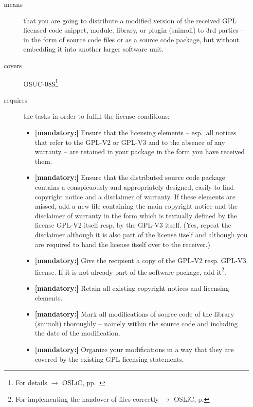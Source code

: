 \begin{description}
\item[means] that you are going to distribute a modified version of the received
GPL licensed code snippet, module, library, or plugin (snimoli) to 3rd parties
-- in the form of source code files or as a source code package, but without
embedding it into another larger software unit.
\item[covers] OSUC-08S\footnote{For details $\rightarrow$ OSLiC, pp.\
\pageref{OSUC-08S-DEF}}
\item[requires] the tasks in order to fulfill the license conditions:
\begin{itemize}
 
  \item \textbf{[mandatory:]} Ensure that the licensing elements -- esp.\ all
  notices that refer to the GPL-V2 or GPL-V3 and to the absence of any
  warranty -- are retained in your package in the form you have received them.

  \item \textbf{[mandatory:]} Ensure that the distributed source code package
  contains a conspicuously and appropriately designed, easily to find copyright
  notice and a disclaimer of warranty. If these elements are missed, add a new
  file containing the main copyright notice and the disclaimer of warranty in the
  form which is textually defined by the license GPL-V2 itself resp. by the
  GPL-V3 itself. (Yes, repeat the disclaimer although it is also part of the
  license itself and although you are required to hand the license itself over
  to the receiver.)
  
  \item \textbf{[mandatory:]} Give the recipient a copy of the GPL-V2 resp.
  GPL-V3 license. If it is not already part of the software package, add
  it\footnote{For implementing the handover of files correctly $\rightarrow$
  OSLiC, p. \pageref{DistributingFilesHint}}.
  
  \item \textbf{[mandatory:]} Retain all existing copyright notices and
  licensing elements.
  
  \item \textbf{[mandatory:]} Mark all modifications of source code of the
  library (snimoli) thoroughly -- namely within the source code and including
  the date of the modification.
  
  \item \textbf{[mandatory:]} Organize your modifications in a way that they are
  covered by the existing GPL licensing statements.
    

\end{itemize}
\end{description}
